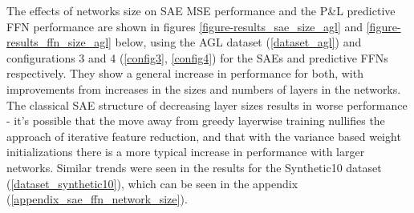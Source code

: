 \documentclass[a4paper,latin]{paper}
\begin{document}
The effects of networks size on SAE MSE performance and the P\&L predictive FFN performance are shown in figures \ref{figure-results_sae_size_agl} and \ref{figure-results_ffn_size_agl} below, using the AGL dataset (\ref{dataset_agl}) and configurations 3 and 4 (\ref{config3}, \ref{config4}) for the SAEs and predictive FFNs respectively. They show a general increase in performance for both, with improvements from increases in the sizes and numbers of layers in the networks. The classical SAE structure of decreasing layer sizes results in worse performance - it's possible that the move away from greedy layerwise training nullifies the approach of iterative feature reduction, and that with the variance based weight initializations there is a more typical increase in performance with larger networks. Similar trends were seen in the results for the Synthetic10 dataset (\ref{dataset_synthetic10}), which can be seen in the appendix (\ref{appendix_sae_ffn_network_size}).
\end{document}
